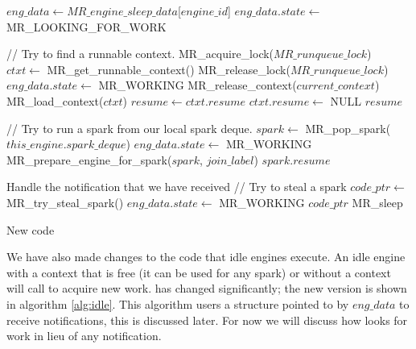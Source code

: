 \begin{algorithm}[tbp]
\begin{algorithmic}[1]
        \State $eng\_data \gets MR\_engine\_sleep\_data$[$engine\_id$]
        \State $eng\_data.state \gets$ MR\_LOOKING\_FOR\_WORK

        \State \State // Try to find a runnable context.
        \State MR\_acquire\_lock($MR\_runqueue\_lock$)
        \State $ctxt \gets$ MR\_get\_runnable\_context()
        \State MR\_release\_lock($MR\_runqueue\_lock$)
            \State $eng\_data.state \gets$ MR\_WORKING
                \State MR\_release\_context($current\_context$)
            \EndIf
            \State MR\_load\_context($ctxt$)
            \State $resume \gets ctxt.resume$
            \State $ctxt.resume \gets$ NULL
            \Goto $resume$
        \EndIf
       
        \State \State // Try to run a spark from our local spark deque.
        \State $spark \gets$ MR\_pop\_spark($this\_engine.spark\_deque$)
            \State $eng\_data.state \gets$ MR\_WORKING
            \State MR\_prepare\_engine\_for\_spark($spark$, $join\_label$)
            \Goto $spark.resume$
        \EndIf

        \State
            \State Handle the notification that we have received
        \EndIf
        \State // Try to steal a spark
        \State $code\_ptr \gets$ MR\_try\_steal\_spark()
            \State $eng\_data.state \gets$ MR\_WORKING
            \Goto $code\_ptr$
        \EndIf
        \Goto MR\_sleep
    \EndProcedure
\end{algorithmic}
\caption{New \idle code}
\label{alg:idle}
\end{algorithm}

We have also made changes to the code that idle engines execute.
An idle engine with a context that is free (it can be used for any spark) or
without a context will call \idle to acquire new work.
\idle has changed significantly;
the new version is shown in algorithm \ref{alg:idle}.
This algorithm users a structure pointed to by $eng\_data$ to receive
notifications,
this is discussed later.
For now we will discuss how \idle looks for work in lieu of any notification.


